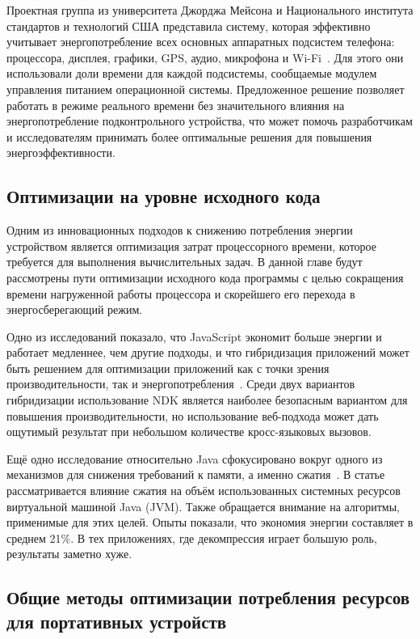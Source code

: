 \documentclass[a4paper,14pt]{extarticle} %
\begin{document}
	Проектная группа из университета Джорджа Мейсона и Национального института стандартов и технологий США представила систему, которая эффективно учитывает энергопотребление всех основных аппаратных подсистем телефона: процессора, дисплея, графики, GPS, аудио, микрофона и Wi-Fi~\parencite{murmuria2012mobile}. Для этого они использовали доли времени для каждой подсистемы, сообщаемые модулем управления питанием операционной системы. Предложенное решение позволяет работать в режиме реального времени без значительного влияния на энергопотребление подконтрольного устройства, что может помочь разработчикам и исследователям принимать более оптимальные решения для повышения энергоэффективности.

	\subsection{Оптимизации на уровне исходного кода}

	Одним из инновационных подходов к снижению потребления энергии устройством является оптимизация затрат процессорного времени, которое требуется для выполнения вычислительных задач. В данной главе будут рассмотрены пути оптимизации исходного кода программы с целью сокращения времени нагруженной работы процессора и скорейшего его перехода в энергосберегающий режим.
	
	Одно из исследований показало, что JavaScript экономит больше энергии и работает медленнее, чем другие подходы, и что гибридизация приложений может быть решением для оптимизации приложений как с точки зрения производительности, так и энергопотребления~\parencite{oliveira2017study}. Среди двух вариантов гибридизации использование NDK является наиболее безопасным вариантом для повышения производительности, но использование веб-подхода может дать ощутимый результат при небольшом количестве кросс-языковых вызовов.
	
	Ещё одно исследование относительно Java сфокусировано вокруг одного из механизмов для снижения требований к памяти, а именно сжатия~\parencite{гуанджиу2004экономия}. В статье рассматривается влияние сжатия на объём использованных системных ресурсов виртуальной машиной Java (JVM). Также обращается внимание на алгоритмы, применимые для этих целей. Опыты показали, что экономия энергии составляет в среднем 21\%. В тех приложениях, где декомпрессия играет большую роль, результаты заметно хуже.
	
	\subsection{Общие  методы оптимизации потребления ресурсов для портативных устройств}
	
\end{document}
